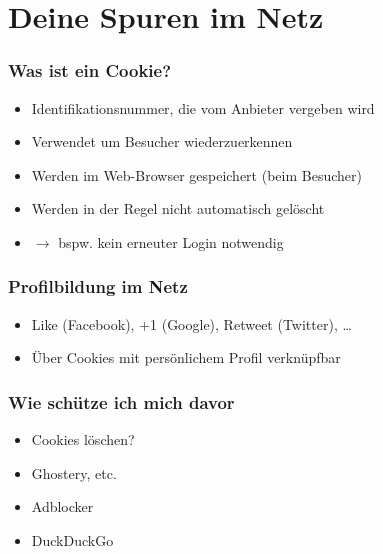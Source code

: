 \section{Deine Spuren im Netz}

\begin{frame}
\frametitle{Was ist ein Cookie?}

\begin{itemize}
  \item Identifikationsnummer, die vom Anbieter vergeben wird
  \item Verwendet um Besucher wiederzuerkennen
  \item Werden im Web-Browser gespeichert (beim Besucher)
  \item Werden in der Regel nicht automatisch gelöscht
  \item $\rightarrow$ bspw. kein erneuter Login notwendig
\end{itemize}

\end{frame}

\begin{frame}
\frametitle{Profilbildung im Netz}

\begin{itemize}
  \item Like (Facebook), +1 (Google), Retweet (Twitter), \dots
  \item Über Cookies mit persönlichem Profil verknüpfbar
\end{itemize}

\end{frame}

\begin{frame}
  \frametitle{Wie schütze ich mich davor}
  \begin{itemize}
    \item Cookies löschen?
    \item Ghostery, etc.
    \item Adblocker
    \item DuckDuckGo
  \end{itemize}
\end{frame}


